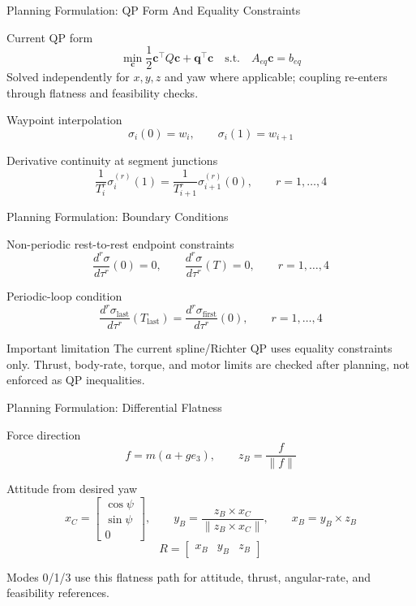 \documentclass[aspectratio=169,11pt]{beamer}
\begin{document}
\begin{frame}{Planning Formulation: QP Form And Equality Constraints}
\begin{block}{Current QP form}
\[
\min_{\mathbf c}\frac{1}{2}\mathbf c^\top Q\mathbf c+\mathbf q^\top\mathbf c
\quad\text{s.t.}\quad
A_{eq}\mathbf c=b_{eq}
\]
\small Solved independently for \(x,y,z\) and yaw where applicable; coupling re-enters through flatness and feasibility checks.
\end{block}

\begin{block}{Waypoint interpolation}
\[
\sigma_i(0)=w_i,\qquad \sigma_i(1)=w_{i+1}
\]
\end{block}

\begin{block}{Derivative continuity at segment junctions}
\[
\frac{1}{T_i^r}\sigma_i^{(r)}(1)
=
\frac{1}{T_{i+1}^r}\sigma_{i+1}^{(r)}(0),
\qquad r=1,\dots,4
\]
\end{block}
\end{frame}

\begin{frame}{Planning Formulation: Boundary Conditions}
\begin{block}{Non-periodic rest-to-rest endpoint constraints}
\[
\frac{d^r\sigma}{d\tau^r}(0)=0,
\qquad
\frac{d^r\sigma}{d\tau^r}(T)=0,
\qquad r=1,\dots,4
\]
\end{block}

\begin{block}{Periodic-loop condition}
\[
\frac{d^r\sigma_{\mathrm{last}}}{d\tau^r}(T_{\mathrm{last}})
=
\frac{d^r\sigma_{\mathrm{first}}}{d\tau^r}(0),
\qquad r=1,\dots,4
\]
\end{block}

\begin{block}{Important limitation}
The current spline/Richter QP uses equality constraints only. Thrust, body-rate, torque, and motor limits are checked after planning, not enforced as QP inequalities.
\end{block}
\end{frame}

\begin{frame}{Planning Formulation: Differential Flatness}
\begin{block}{Force direction}
\[
f=m(a+g e_3),\qquad z_B=\frac{f}{\|f\|}
\]
\end{block}

\begin{block}{Attitude from desired yaw}
\[
x_C=
\begin{bmatrix}
\cos\psi\\
\sin\psi\\
0
\end{bmatrix},
\qquad
y_B=\frac{z_B\times x_C}{\|z_B\times x_C\|},
\qquad
x_B=y_B\times z_B
\]
\[
R=\begin{bmatrix}x_B & y_B & z_B\end{bmatrix}
\]
\end{block}

\small Modes 0/1/3 use this flatness path for attitude, thrust, angular-rate, and feasibility references.
\end{frame}
\end{document}
